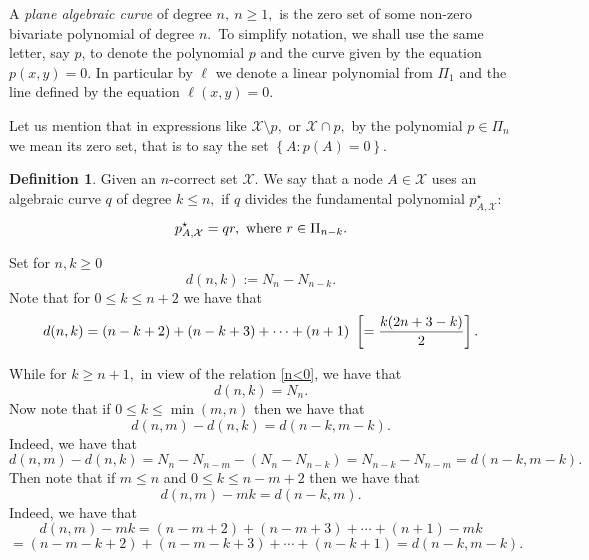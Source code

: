 \documentclass[a4paper,12pt]{article}
\theoremstyle{definition}
\newtheorem{definition}[lemma]{Definition}
\numberwithin{equation}{section}
\numberwithin{figure}{section}
\newcommand{\Xset}{\mathcal{X}}
\begin{document}
A \emph{plane algebraic curve} of degree $n,\ n\ge 1,$ is the zero set of some non-zero bivariate polynomial of degree $n.$~To simplify notation, we shall use the same letter,  say $p$,
to denote the polynomial $p$ and the curve given by the equation $p(x,y)=0$.
In particular by $\ell$ we denote a linear
polynomial from $\Pi_1$ and the line defined by the equation
$\ell(x, y)=0.$

Let us mention that in expressions like $\Xset\setminus p,$ or ${\mathcal X \cap p},$ by the polynomial $p\in\Pi_n$ we mean its zero set, that is to say the set $\left\{A : p(A)=0\right\}.$

\begin{definition}
Given an $n$-correct set $\Xset$. We say that a node $A \in \Xset$ uses an algebraic curve $q$ of degree $k\le n,$
if $q$ divides the fundamental polynomial $p_{A, \Xset}^\star:$
$$p_{A, \Xset}^\star= q r, \ \hbox{where} \ r\in\Pi_{n-k}.$$
\end{definition}



\noindent Set  for $n,k\ge 0$
\begin{equation}\label{dnk1}d(n, k) := N_n - N_{n-k}.\end{equation}
Note that for $0\le k\le n+2$ we have that
\begin{equation}\label{dnk2}d(n, k) = (n-k+2)+(n-k+3)+\cdots+(n+1)\ \left[={k(2n+3-k)\over 2}\right].\end{equation}

\noindent While for $k\ge n+1,$ in view of the relation \eqref{n<0}, we have that 
\begin{equation}\label{k>n}d(n, k) = N_n.\end{equation}
Now note that if $0\le k\le \min(m,n)$ then we have that
\begin{equation} \label{nmk1} d(n,m)-d(n,k)=d(n-k,m-k).\end{equation}
Indeed, we have that 
$$d(n,m)-d(n,k)=N_n - N_{n-m}-(N_n - N_{n-k})=N_{n-k}- N_{n-m}=d(n-k,m-k).$$
Then note that if $m\le n$ and $0\le k\le n- m+2$ then we have that
\begin{equation} \label{nmk2}  d(n,m)-mk=d(n-k,m). \end{equation} 
Indeed, we have that 
$$d(n,m)-mk=(n-m+2)+(n-m+3)+\cdots+(n+1)-mk$$ 
$$= (n-m-k+2)+(n-m-k+3)+\cdots+(n-k+1)=d(n-k,m-k).$$
\end{document}
